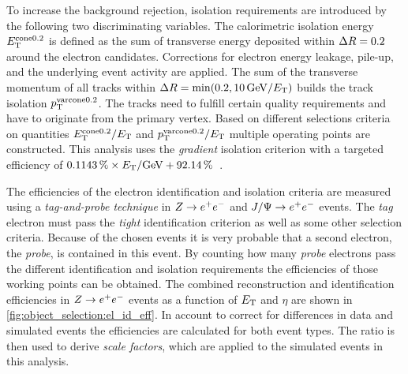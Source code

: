 To increase the background rejection, isolation requirements are introduced by the following two discriminating variables.
The calorimetric isolation energy $E_\text{T}^{\text{cone}0.2}$ is defined as the sum of transverse energy deposited within
$\Delta R = 0.2$ around the electron candidates.
Corrections for electron energy leakage, pile-up, and the underlying event activity are applied.
The sum of the transverse momentum of all tracks within $\dr = \min(0.2, \unit[10]{GeV} / \et)$ builds the
track isolation $p_\text{T}^{\text{varcone}0.2}$. The tracks need to fulfill certain quality requirements and have to originate
from the primary vertex.
Based on different selections criteria on quantities $E_\text{T}^{\text{cone}0.2} / E_\text{T}$ and
$p_\text{T}^{\text{varcone}0.2} / E_\text{T}$ multiple operating points are constructed. This analysis uses the \emph{gradient}
isolation criterion with a targeted efficiency of
$\unit[0.1143]{\%} \times \et / \text{GeV} + \unit[92.14]{\%}$~\cite{ATLAS-CONF-2016-024}.

The efficiencies of the electron identification and isolation criteria are measured using a \emph{tag-and-probe technique}
in $Z \to e^+e^-$ and $J/\Psi \to e^+e^-$ events.
The \emph{tag} electron must pass the \emph{tight} identification criterion as well as some other selection criteria.
Because of the chosen events it is very probable that a second electron, the \emph{probe}, is contained in this event.
By counting how many \emph{probe} electrons pass the different identification and isolation requirements the efficiencies
of those working points can be obtained.
The combined reconstruction and identification efficiencies in $Z \to e^+e^-$ events as a function of $E_\text{T}$ and $\eta$
are shown in \cref{fig:object_selection:el_id_eff}.
In account to correct for differences in data and simulated events the efficiencies are calculated for both event types.
The ratio is then used to derive \emph{scale factors}, which are applied to the simulated events in this analysis.


